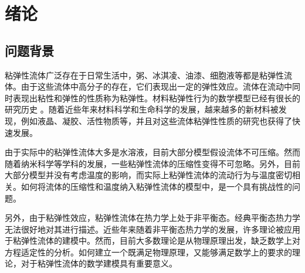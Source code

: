  \chapter{绪论}

\section{问题背景}
粘弹性流体广泛存在于日常生活中，粥、冰淇凌、油漆、细胞液等都是粘弹性流体。由于这些流体中高分子的存在，它们表现出一定的弹性效应。流体在流动中同时表现出粘性和弹性的性质称为粘弹性。材料粘弹性行为的数学模型已经有很长的研究历史\cite{maxwell2013scientific,kelvin1887stability,oldroyd1950formulation,weissenberg1947continuum,zimm1956dynamics,ferry1980viscoelastic,larson1999structure} 。随着近些年来材料科学和生命科学的发展，越来越多的新材料被发现，例如液晶、凝胶、活性物质等\cite{de1975physics,prost2015active,marchetti2013hydrodynamics,ramaswamy2010mechanics,berthier2013non}，并且对这些流体粘弹性性质的研究也获得了快速发展\cite{lin2012some,larson1999structure,joseph2013fluid}。

由于实际中的粘弹性流体大多是水溶液，目前大部分模型假设流体不可压缩。然而随着纳米科学等学科的发展，一些粘弹性流体的压缩性变得不可忽略\cite{yu2015compressible,galstyan2015note,chakraborty2015constitutive,pelton2009damping,kim1999numerical,lind2013bubble}。另外，目前大部分模型并没有考虑温度的影响，而实际上粘弹性流体的流动行为与温度密切相关。如何将流体的压缩性和温度纳入粘弹性流体的模型中，是一个具有挑战性的问题\cite{grmela1997dynamicsI,ottinger1997dynamicsII,larson1999structure}。

另外，由于粘弹性效应，粘弹性流体在热力学上处于非平衡态。经典平衡态热力学无法很好地对其进行描述。近些年来随着非平衡态热力学的发展，许多理论被应用于粘弹性流体的建模中\cite{jou1996extended,beris2013thermodynamics,ottinger2005beyond,coleman1961foundations,coleman1964thermodynamics,truesdell2012rational,truesdell2004non,eringen2012microcontinuum,eringen1965theory,zhu2014conservation}。然而，目前大多数理论是从物理原理出发，缺乏数学上对方程适定性的分析。如何建立一个既满足物理原理，又能够满足数学上的要求的理论，对于粘弹性流体的数学建模具有重要意义\cite{zhu2014conservation,larson1999structure}。



